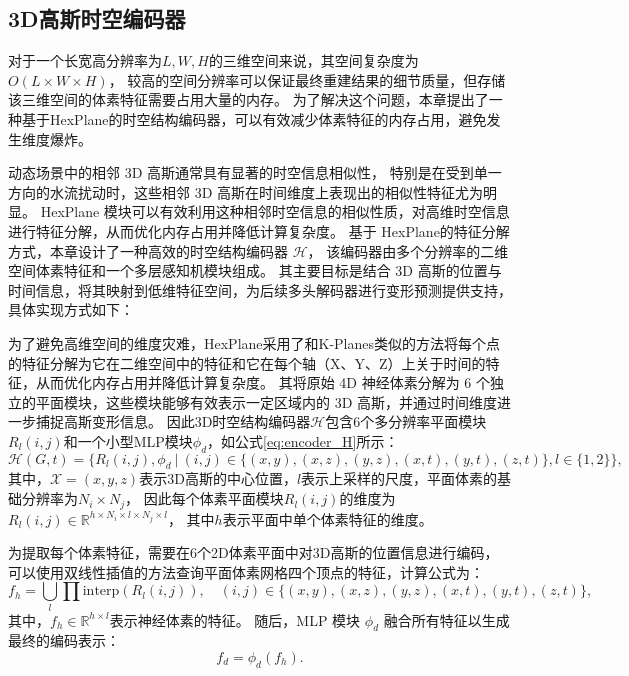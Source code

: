 \subsection{3D高斯时空编码器}
对于一个长宽高分辨率为$L, W, H$的三维空间来说，其空间复杂度为$O(L \times W \times H)$，
较高的空间分辨率可以保证最终重建结果的细节质量，但存储该三维空间的体素特征需要占用大量的内存。
为了解决这个问题，本章提出了一种基于HexPlane\cite{hex_plane}的时空结构编码器，可以有效减少体素特征的内存占用，避免发生维度爆炸。

动态场景中的相邻 3D 高斯通常具有显著的时空信息相似性，
特别是在受到单一方向的水流扰动时，这些相邻 3D 高斯在时间维度上表现出的相似性特征尤为明显。
HexPlane 模块可以有效利用这种相邻时空信息的相似性质，对高维时空信息进行特征分解，从而优化内存占用并降低计算复杂度。
基于 HexPlane的特征分解方式，本章设计了一种高效的时空结构编码器 $\mathcal{H}$，
该编码器由多个分辨率的二维空间体素特征和一个多层感知机模块组成。
其主要目标是结合 3D 高斯的位置与时间信息，将其映射到低维特征空间，为后续多头解码器进行变形预测提供支持，具体实现方式如下：

为了避免高维空间的维度灾难，HexPlane采用了和K-Planes\cite{k-planes}类似的方法将每个点的特征分解为它在二维空间中的特征和它在每个轴（X、Y、Z）上关于时间的特征，从而优化内存占用并降低计算复杂度。
其将原始 4D 神经体素分解为 6 个独立的平面模块，这些模块能够有效表示一定区域内的 3D 高斯，并通过时间维度进一步捕捉高斯变形信息。
因此3D时空结构编码器$\mathcal{H}$包含6个多分辨率平面模块$R_l(i,j)$和一个小型MLP模块$\phi_d$，如公式\ref{eq:encoder_H}所示：
\begin{equation}
\label{eq:encoder_H}
\mathcal{H}(G, t) = \{ R_l(i,j), \phi_d \ | \ (i,j) \in \{(x,y), (x,z), (y,z), (x,t), (y,t), (z,t)\}, l \in \{1, 2\} \},
\end{equation}
其中，$\mathcal{X} = (x, y, z)$表示3D高斯的中心位置，$l$表示上采样的尺度，平面体素的基础分辨率为$N_i \times N_j$，
因此每个体素平面模块$R_l(i,j)$的维度为$R_l(i,j) \in \mathbb{R}^{h \times N_i \times l \times N_j \times l}$，
其中$h$表示平面中单个体素特征的维度。

为提取每个体素特征，需要在6个2D体素平面中对3D高斯的位置信息进行编码，可以使用双线性插值的方法查询平面体素网格四个顶点的特征，计算公式为：
\begin{equation}
f_h = \bigcup_l \prod \text{interp}(R_l(i,j)), \quad (i,j) \in \{(x,y),(x,z),(y,z),(x,t),(y,t),(z,t)\},
\end{equation}
其中，$f_h \in \mathbb{R}^{h \times l}$表示神经体素的特征。
随后，MLP 模块 $\phi_d$ 融合所有特征以生成最终的编码表示：
\begin{equation}
f_d = \phi_d(f_h).
\end{equation}  

